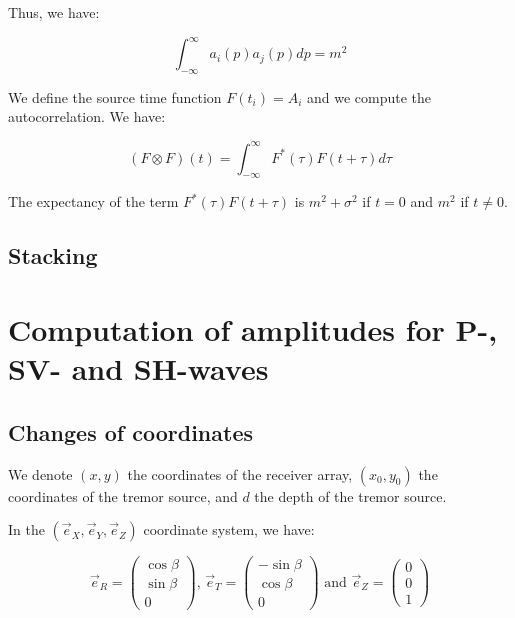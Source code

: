 \documentclass[main.tex]{subfiles}
\begin{document}
Thus, we have:

\begin{equation}
\int_{- \infty}^{\infty} a_i (p) a_j (p) dp = m^2
\end{equation}

We define the source time function $F (t_i) = A_i$ and we compute the autocorrelation. We have:

\begin{equation}
(F \otimes F) (t) = \int_{- \infty}^{\infty} F^* (\tau) F (t + \tau) d\tau
\end{equation}

The expectancy of the term $F^* (\tau) F (t + \tau)$ is $m^2 + \sigma^2$ if $t = 0$ and $m^2$ if $t \neq 0$.

\section{Stacking}

\chapter{Computation of amplitudes for P-, SV- and SH-waves}

\section{Changes of coordinates}

We denote $(x, y)$ the coordinates of the receiver array, $(x_0, y_0)$ the coordinates of the tremor source, and $d$ the depth of the tremor source.

In the $(\vec{e}_X, \vec{e}_Y, \vec{e}_Z)$ coordinate system, we have:

\begin{equation}
\vec{e}_R = \begin{pmatrix}
\cos \beta \\
\sin \beta \\
0
\end{pmatrix} \text{, } \vec{e}_T = \begin{pmatrix}
- \sin \beta \\
\cos \beta \\
0
\end{pmatrix} \text{ and } \vec{e}_Z = \begin{pmatrix}
0 \\
0 \\
1
\end{pmatrix}
\end{equation}
\end{document}
